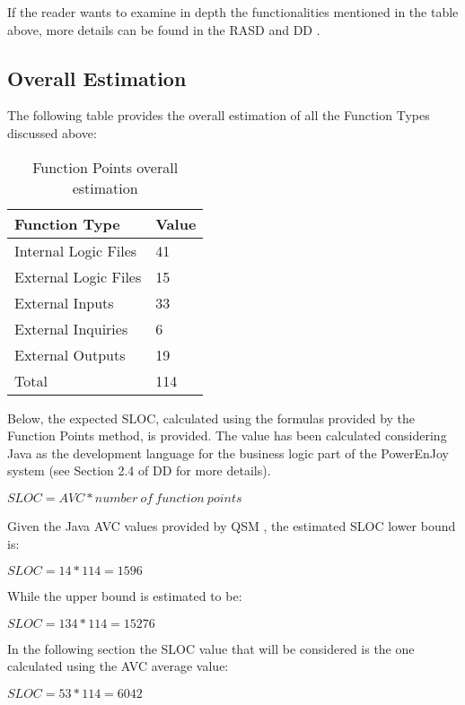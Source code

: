 If the reader wants to examine in depth the functionalities mentioned in the table above, more details can be found in the RASD \cite{rasd} and DD \cite{dd}.

\subsection{Overall Estimation}
The following table provides the overall estimation of all the Function Types discussed above:

\begin{table}[H]
	\centering
	\caption{Function Points overall estimation}
	\label{tab:overall_fps}
	\begin{tabular}{|l|l|}
		\hline
		Function Type		&	Value	\\ \hline
		Internal Logic Files	&	41	\\
		External Logic Files	&	15	\\ 
		External Inputs			&	33	\\ 
		External Inquiries		&	6	\\ 
		External Outputs		&	19	\\ \hline
		Total					&	114	\\
		\hline
	\end{tabular}
\end{table}

Below, the expected SLOC, calculated using the formulas provided by the Function Points method, is provided. The value has been calculated considering Java as the development language for the business logic part of the PowerEnJoy system (see Section 2.4 of DD \cite{dd} for more details).

\begin{center}
$SLOC = AVC * number \ of \ function \ points$
\end{center}
Given the Java AVC values provided by QSM \cite{avc_qsm}, the estimated SLOC lower bound is:
\begin{center}
$SLOC = 14 * 114 = 1596$
\end{center}
While the upper bound is estimated to be:
\begin{center}
$SLOC = 134 * 114 = 15276$
\end{center}
In the following section the SLOC value that will be considered is the one calculated using the AVC average value:
\begin{center}
$SLOC = 53 * 114 = 6042$
\end{center}
